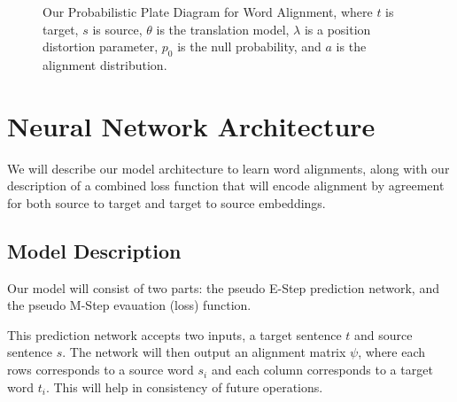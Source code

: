 \documentclass[twoside,twocolumn]{article}
\begin{document}
\begin{figure}
\centering
{}
\caption{Our Probabilistic Plate Diagram for Word Alignment, where $t$ is target, $s$ is source, $\theta$ is the translation model, $\lambda$ is a position distortion parameter, $p_0$ is the null probability, and $a$ is the alignment distribution.}
\end{figure}

\section{Neural Network Architecture}

We will describe our model architecture to learn word alignments, along with our description of a combined loss function that will encode alignment by agreement for both source to target and target to source embeddings.


\subsection{Model Description}

Our model will consist of two parts: the pseudo E-Step prediction network, and the pseudo M-Step evauation (loss) function.

This prediction network accepts two inputs, a target sentence $t$ and source sentence $s$. The network will then output an alignment matrix $\psi$, where each rows corresponds to a source word $s_i$ and each column corresponds to a target word $t_i$. This will help in consistency of future operations.
\end{document}
